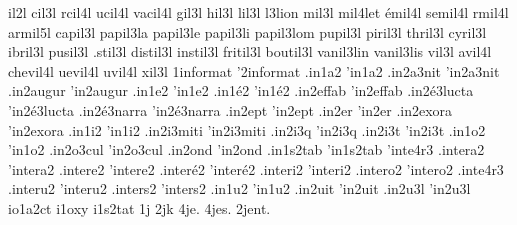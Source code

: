 {    il2l
   cil3l
  rcil4l
  ucil4l
 vacil4l
   gil3l
   hil3l
   lil3l
     l3lion
   mil3l
   mil4let
  émil4l
 semil4l
  rmil4l
 armil5l
 capil3l
 papil3la
 papil3le
 papil3li
 papil3lom
 pupil3l
 piril3l
 thril3l
 cyril3l
 ibril3l
 pusil3l
 .stil3l
distil3l
instil3l
fritil3l
boutil3l
 vanil3lin
 vanil3lis
   vil3l
  avil4l
chevil4l
 uevil4l
  uvil4l
   xil3l
                    1informat %
                    '2informat
                    .in1a2
                    'in1a2
                    .in2a3nit
                    'in2a3nit
                    .in2augur
                    'in2augur
                    .in1e2
                    'in1e2
                    .in1é2
                    'in1é2
                    .in2effab %
                    'in2effab
                    .in2é3lucta
                    'in2é3lucta
                    .in2é3narra
                    'in2é3narra
                    .in2ept
                    'in2ept
                    .in2er
                    'in2er
                    .in2exora %
                    'in2exora
                    .in1i2
                    'in1i2
                    .in2i3miti
                    'in2i3miti
                    .in2i3q
                    'in2i3q
                    .in2i3t
                    'in2i3t
                    .in1o2
                    'in1o2
                    .in2o3cul
                    'in2o3cul
                    .in2ond
                    'in2ond
                    .in1s2tab
                    'in1s2tab
                    'inte4r3
                    .intera2
                    'intera2
                    .intere2
                    'intere2
                    .interé2
                    'interé2
                    .interi2
                    'interi2
                    .intero2
                    'intero2
                    .inte4r3
                    .interu2
                    'interu2
                    .inters2
                    'inters2
                    .in1u2
                    'in1u2
                    .in2uit
                    'in2uit
                    .in2u3l
                    'in2u3l
                    io1a2ct
                    i1oxy
                    i1s2tat
1j
2jk
4je.
4jes.
2jent. %
}
